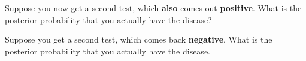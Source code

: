 %
\begin{frame}
Suppose you now get a second test, which \textbf{also} comes out
\textbf{positive}. What is the posterior probability that you actually have the
disease?

\hfill

Suppose you get a second test, which comes back \textbf{negative}.  What is the
posterior probability that you actually have the disease.
\end{frame}
